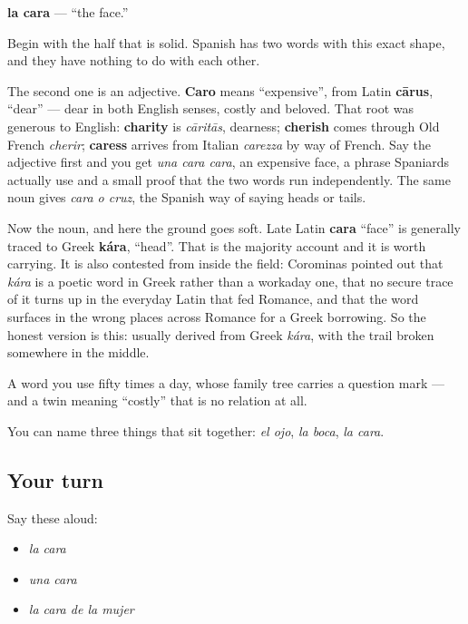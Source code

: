 \begin{cousinweb}
\textbf{la cara} — \textquotedblleft{}the face.\textquotedblright{}

Begin with the half that is solid. Spanish has two words with this exact shape, and they have nothing to do with each other.

The second one is an adjective. \textbf{Caro} means \textquotedblleft{}expensive\textquotedblright{}, from Latin \textbf{cārus}, \textquotedblleft{}dear\textquotedblright{} — dear in both English senses, costly and beloved. That root was generous to English: \textbf{charity} is \emph{cāritās}, dearness; \textbf{cherish} comes through Old French \emph{cherir}; \textbf{caress} arrives from Italian \emph{carezza} by way of French. Say the adjective first and you get \emph{una cara cara}, an expensive face, a phrase Spaniards actually use and a small proof that the two words run independently. The same noun gives \emph{cara o cruz}, the Spanish way of saying heads or tails.

Now the noun, and here the ground goes soft. Late Latin \textbf{cara} \textquotedblleft{}face\textquotedblright{} is generally traced to Greek \textbf{kára}, \textquotedblleft{}head\textquotedblright{}. That is the majority account and it is worth carrying. It is also contested from inside the field: Corominas pointed out that \emph{kára} is a poetic word in Greek rather than a workaday one, that no secure trace of it turns up in the everyday Latin that fed Romance, and that the word surfaces in the wrong places across Romance for a Greek borrowing. So the honest version is this: usually derived from Greek \emph{kára}, with the trail broken somewhere in the middle.

A word you use fifty times a day, whose family tree carries a question mark — and a twin meaning \textquotedblleft{}costly\textquotedblright{} that is no relation at all.
\end{cousinweb}

\begin{grammarlens}[title={What you've built}]
You can name three things that sit together: \emph{el ojo}, \emph{la boca}, \emph{la cara}.
\end{grammarlens}

\subsection*{Your turn}
Say these aloud:

\begin{itemize}
\raggedright
  \item \emph{la cara}
  \item \emph{una cara}
  \item \emph{la cara de la mujer}
\end{itemize}


